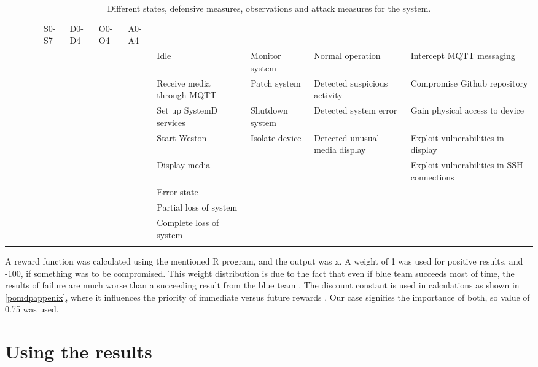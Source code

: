 \begin{landscape}
\begin{table}
\centering
\begin{tabular}{ |c|c|c|c| }
 \hline & & & & S0-S7 & D0-D4 & O0-O4 & A0-A4 \\ & & & & \hline \hline
 & & & & Idle & Monitor system & Normal operation & Intercept MQTT
 messaging \\ & & & & \hline & & & & Receive media through MQTT &
 Patch system & Detected suspicious activity & Compromise Github
 repository \\ & & & & \hline & & & & Set up SystemD services &
 Shutdown system & Detected system error & Gain physical access to
 device \\ & & & & \hline & & & & Start Weston & Isolate device &
 Detected unusual media display & Exploit vulnerabilities in display
 \\ & & & & \hline & & & & Display media & & & Exploit vulnerabilities
 in SSH connections \\ & & & & \hline & & & & Error state & \ & \ &
 \\ & & & & \hline & & & & Partial loss of system & & & \\ & & & &
 \hline & & & & Complete loss of system & & & \\ & & & & \hline

\end{tabular}
\caption{Different states, defensive measures, observations and attack
  measures for the system.}
\label{pomdbtable}
\end{table}
\end{landscape}

A reward function was calculated using the mentioned R program, and
the output was x. A weight of 1 was used for positive results, and
-100, if something was to be compromised. This weight distribution is
due to the fact that even if blue team succeeds most of time, the
results of failure are much worse than a succeeding result from the
blue team \cite{carin2008cybersecurity}. The discount constant is used
in calculations as shown in \ref{pomdpappenix}, where it influences
the priority of immediate versus future rewards
\cite{mcabeeMarkov}. Our case signifies the importance of both, so
value of 0.75 was used.

\section{Using the results}

